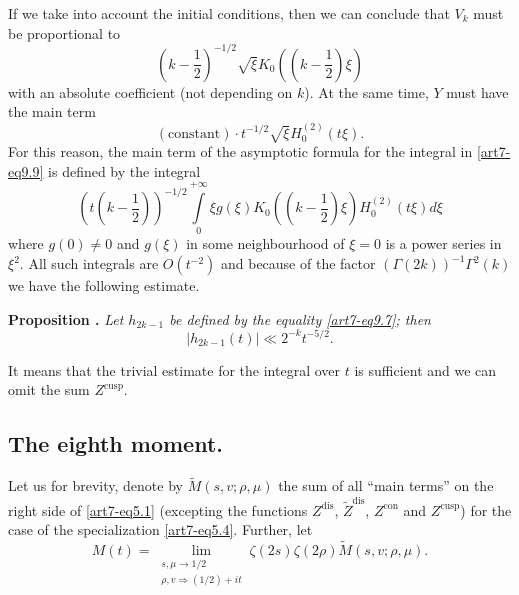 If we take into account the initial conditions, then we can conclude that $V_k$ must be proportional to 
\begin{equation}
(k-\frac{1}{2})^{-1/2} \sqrt{\xi} K_0  ((k -\frac{1}{2}) \xi) \label{art7-eq9.21}
\end{equation}
with an absolute coefficient (not depending on $k$). At the same time, $Y$ must have the main term
\begin{equation}
(\text{constant}) \cdot t^{-1/2} \sqrt{\xi} H_0^{(2)} (t \xi).\label{art7-eq9.22}
\end{equation}
For this reason, the main term of the asymptotic formula for the integral in \eqref{art7-eq9.9} is defined by the integral 
\begin{equation}
(t(k -\frac{1}{2}))^{-1/2} \int\limits^{+\infty}_0  \xi g (\xi) K_0 ((k-\frac{1}{2}) \xi) H^{(2)}_0(t \xi) d \xi \label{art7-eq9.23}
\end{equation}
where $g(0) \neq 0$ and $g (\xi)$ in some neighbourhood of $\xi =0$ is a power series in $\xi^2$. All such integrals are $O(t^{-2})$ and because of the factor $(\Gamma (2k))^{-1} \Gamma^2 (k)$ we have the following estimate.

\medskip
\noindent
{\bfseries Proposition .\label{art7-prop17}}
\textit{Let $h_{2k-1}$ be defined by the equality \eqref{art7-eq9.7}; then}
\begin{equation}
|h_{2k-1} (t)| \ll 2^{-k} t^{-5/2}. \label{art7-eq9.24}
\end{equation}

It means that the trivial estimate for the integral over $t$ is sufficient and we can omit the sum $Z^{\text{cusp}}$.

\setcounter{section}{2}
\subsection{The eighth moment.}\label{art7-subsec2.9}
Let us for brevity, denote by $\tilde{M}(s,v; \rho, \mu)$ the sum of all ``main terms'' on the right side of \eqref{art7-eq5.1} (excepting the functions $Z^{\text{dis}}$, $\tilde{Z}^{\text{dis}}$, $Z^{\text{con}}$ and $Z^{\text{cusp}}$) for the case of the specialization \eqref{art7-eq5.4}. Further, let 
\setcounter{section}{10}
\setcounter{equation}{0}
\begin{equation}
M(t) = \lim\limits_{\substack{s, \mu \to 1/2\\ \rho, v \Rightarrow  (1/2) + it}} \zeta (2s) \zeta(2\rho) \tilde{M} (s, v; \rho, \mu). \label{art7-eq10.1}
\end{equation}\pageoriginale

